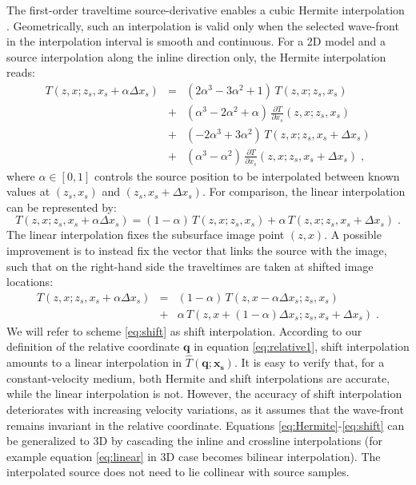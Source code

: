 The first-order traveltime source-derivative enables a cubic Hermite interpolation 
\cite[]{press}. Geometrically, such an interpolation is valid only when the selected 
wave-front in the interpolation interval is smooth and continuous. For a 2D model and a 
source interpolation along the inline direction only, the Hermite interpolation reads: 
\begin{equation}
\label{eq:Hermite}
\begin{array}{lcl}
T (z,x; z_s,x_s + \alpha \Delta x_s) 
& = & (2\alpha^3-3\alpha^2+1)\,T (z,x; z_s,x_s) \\
& + & (\alpha^3-2\alpha^2+\alpha)\,\frac{\partial T}{\partial x_s} (z,x; z_s,x_s) \\
& + & (-2\alpha^3+3\alpha^2)\,T (z,x; z_s,x_s + \Delta x_s) \\
& + & (\alpha^3-\alpha^2)\,\frac{\partial T}{\partial x_s} (z,x; z_s,x_s + \Delta x_s)\;,
\end{array}
\end{equation}
where $\alpha \in [0,1]$ controls the source position to be interpolated between known 
values at $(z_s,x_s)$ and $(z_s,x_s+\Delta x_s)$. For comparison, the linear interpolation 
can be represented by:
\begin{equation}
\label{eq:linear}
T (z,x; z_s,x_s + \alpha \Delta x_s) = 
(1-\alpha)\,T (z,x; z_s,x_s) + \alpha\,T (z,x; z_s,x_s + \Delta x_s)\;.
\end{equation}
The linear interpolation fixes the subsurface image point $(z,x)$. A possible 
improvement is to instead fix the vector that links the source with the image, such 
that on the right-hand side the traveltimes are taken at shifted image locations:
\begin{equation}
\label{eq:shift}
\begin{array}{lcl}
T (z,x; z_s,x_s + \alpha \Delta x_s) 
& = & (1-\alpha)\,T (z,x- \alpha \Delta x_s; z_s,x_s) \\
& + & \alpha\,T (z,x + (1-\alpha) \Delta x_s; z_s,x_s + \Delta x_s)\;.
\end{array}
\end{equation}
We will refer to scheme \ref{eq:shift} as shift interpolation. According to our definition 
of the relative coordinate $\mathbf{q}$ in equation \ref{eq:relative1}, shift interpolation 
amounts to a linear interpolation in $\hat{T} (\mathbf{q}; \mathbf{x_s})$. It is easy to verify 
that, for a constant-velocity medium, both Hermite and shift interpolations are accurate, 
while the linear interpolation is not. However, the accuracy of shift interpolation deteriorates 
with increasing velocity variations, as it assumes that the wave-front remains invariant in 
the relative coordinate. Equations \ref{eq:Hermite}-\ref{eq:shift} can be generalized to 3D by 
cascading the inline and crossline interpolations (for example equation \ref{eq:linear} in 3D 
case becomes bilinear interpolation). The interpolated source does not need to lie collinear 
with source samples.

